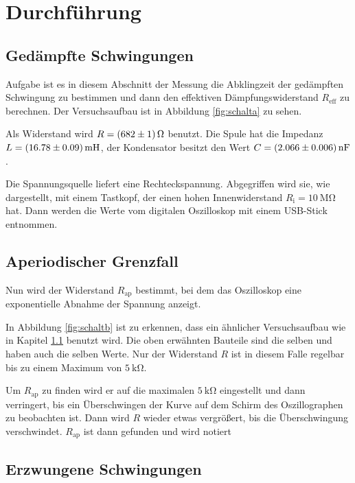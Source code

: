  \section{Durchführung}
\label{sec:Durchführung}

\subsection{Gedämpfte Schwingungen}
\label{sec:durchgedschw}

Aufgabe ist es in diesem Abschnitt der Messung die Abklingzeit der gedämpften
Schwingung zu bestimmen und dann den effektiven Dämpfungswiderstand $R_{\text{eff}}$
zu berechnen.
Der Versuchsaufbau ist in Abbildung \ref{fig:schalta} zu sehen.


Als Widerstand wird $R = \SI{682 +- 1}{\ohm}$ benutzt. Die Spule hat
die Impedanz $L = \SI{16.78 +- 0.09}{\milli\henry}$, der Kondensator besitzt
den Wert $C = \SI{2.066 +- 0.006}{\nano\farad}$.

Die Spannungsquelle liefert eine Rechteckspannung. Abgegriffen wird sie,
wie dargestellt, mit einem Tastkopf, der einen hohen Innenwiderstand
$R_{\text{i}} = \SI{10}{\mega\ohm}$ hat. Dann werden die Werte vom digitalen
Oszilloskop mit einem USB-Stick entnommen.

\subsection{Aperiodischer Grenzfall}

Nun wird der Widerstand $R_{\text{ap}}$ bestimmt, bei dem das Oszilloskop
eine exponentielle Abnahme der Spannung anzeigt.


In Abbildung \ref{fig:schaltb} ist zu erkennen, dass ein ähnlicher
Versuchsaufbau wie in Kapitel \ref{sec:durchgedschw} benutzt wird.
Die oben erwähnten Bauteile sind die selben und haben auch die selben Werte.
Nur der Widerstand $R$ ist in diesem Falle regelbar bis zu einem Maximum
von $\SI{5}{\kilo\ohm}$.

Um $R_{\text{ap}}$ zu finden wird er auf die maximalen $\SI{5}{\kilo\ohm}$
eingestellt und dann verringert, bis ein Überschwingen der Kurve auf dem
Schirm des Oszillographen zu beobachten ist. Dann wird $R$ wieder etwas
vergrößert, bis die Überschwingung verschwindet. $R_{\text{ap}}$ ist dann
gefunden und wird notiert

\subsection{Erzwungene Schwingungen}

